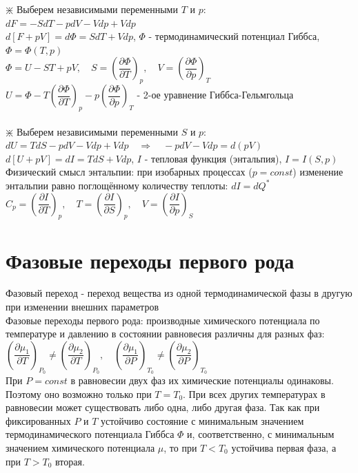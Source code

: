 \begin{multicols*}{2}
		$\divideontimes$ Выберем независимыми переменными $T$ и $p$:\\
		$dF = -SdT - pdV - Vdp + Vdp$\\
		$d\left[F + pV\right] = d\Phi = S dT + V dp$, \quad $\Phi$ - термодинамический потенциал Гиббса, \quad $\Phi = \Phi(T, p)$\\
		$\Phi = U-ST+pV, \quad S = \left(\dfrac{\partial \Phi}{\partial T}\right)_p, \quad V = \left(\dfrac{\partial \Phi}{\partial p}\right)_T$\\
		$U = \Phi - T \left(\dfrac{\partial \Phi}{\partial T}\right)_p - p \left(\dfrac{\partial \Phi}{\partial p}\right)_T$ - 2-ое уравнение Гиббса-Гельмгольца\\\\

		$\divideontimes$ Выберем независимыми переменными $S$ и $p$:\\
		$dU = TdS - pdV - Vdp + Vdp \quad \Rightarrow \quad - pdV - Vdp = d(pV)$\\
		$d\left[U + pV\right] = dI = T dS + V dp$, \quad $I$ - тепловая функция (энтальпия), \quad $I = I(S, p)$\\
		Физический смысл энтальпии: при изобарных процессах ($p = const$) изменение энтальпии равно поглощённому количеству теплоты: $dI = dQ^*$\\
		$C_p = \left(\dfrac{\partial I}{\partial T}\right)_p, \quad T = \left(\dfrac{\partial I}{\partial S}\right)_p, \quad V = \left(\dfrac{\partial I}{\partial p}\right)_S$\\
 
		\section{Фазовые переходы первого рода}
		Фазовый переход - переход вещества из одной термодинамической фазы в другую при изменении внешних параметров\\
		Фазовые переходы первого рода: производные химического потенциала по температуре и давлению в состоянии равновесия различны для разных фаз:\\
		$\left(\dfrac{\partial \mu_1}{\partial T}\right)_{P_0} \neq \left(\dfrac{\partial \mu_2}{\partial T}\right)_{P_0}, \quad \left(\dfrac{\partial \mu_1}{\partial P}\right)_{T_0} \neq \left(\dfrac{\partial \mu_2}{\partial P}\right)_{T_0}$\\
		При $P=const$ в равновесии двух фаз их химические потенциалы одинаковы. Поэтому оно возможно только при $T = T_0$. При всех других температурах в равновесии может существовать либо одна, либо другая фаза. Так как при фиксированных $P$ и $T$ устойчиво состояние с минимальным значением термодинамического потенциала Гиббса $\Phi$ и, соответственно, с минимальным значением химического потенциала $\mu$, то при $T < T_0$ устойчива первая фаза, а при $T > T_0$ вторая.


\end{multicols*}
